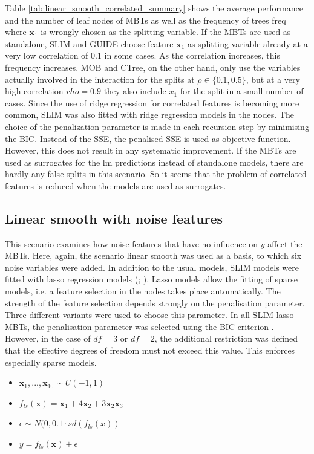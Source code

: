 Table \ref{tab:linear_smooth_correlated_summary} shows the average performance and the number of leaf nodes of MBTs  as well as the frequency of trees freq where $\textbf{x}_1$ is wrongly chosen as the splitting variable.
If the MBTs are used as standalone, SLIM and GUIDE choose feature $\textbf{x}_1$ as splitting variable already at a very low correlation of 0.1 in some cases. As the correlation increases, this frequency increases. MOB and CTree, on the other hand, only use the variables actually involved in the interaction for the splits at $\rho \in \{0.1, 0.5\}$, but at a very high correlation $rho = 0.9$ they also include $x_1$ for the split in a small number of cases. 
Since the use of ridge regression for correlated features is becoming more common, SLIM was also fitted with ridge regression models in the nodes. The choice of the penalization parameter is made in each recursion step by minimising the BIC. Instead of the SSE, the penalised SSE is used as objective function. However, this does not result in any systematic improvement. 
If the MBTs are used as surrogates for the lm predictions instead of standalone models, there are hardly any false splits in this scenario. So it seems that the problem of correlated features is reduced when the models are used as surrogates.


\subsection{Linear smooth with noise features}
This scenario examines how noise features that have no influence on $y$ affect the MBTs. Here, again, the scenario linear smooth was used as a basis, to which six noise variables were added.
In addition to the usual models, SLIM models were fitted with lasso regression models (\citealp{Tibshirani.1996};  \citealp{Friedman.2010}). Lasso models allow the fitting of sparse models, i.e. a feature selection in the nodes takes place automatically. The strength of the feature selection depends strongly on the penalisation parameter. Three different variants were used to choose this parameter. In all SLIM lasso MBTs, the penalisation parameter was selected using the BIC criterion \citep{Sabourin.2015}. However, in the case of $df = 3$ or $df = 2$, the additional restriction was defined that the effective degrees of freedom must not exceed this value. This enforces especially sparse models.

\begin{itemize}
    \item $\textbf{x}_1,..., \textbf{x}_{10} \sim U(-1,1)$
    \item $ f_{ls}(\textbf{x}) = \textbf{x}_1 + 4   \textbf{x}_2 + 3   \textbf{x}_2   \textbf{x}_3 $
    \item $\epsilon \sim N(0, 0.1 \cdot sd(f_{ls}(x))$
    \item $y = f_{ls}(\textbf{x}) + \epsilon$
\end{itemize}

